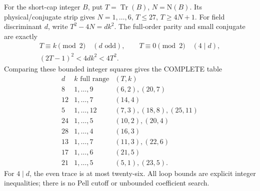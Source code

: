 For the short-cap integer \(B\), put
\(T=\operatorname{Tr}(B)\), \(N=\mathrm N(B)\).
Its physical/conjugate strip gives
\(N=1,\ldots,6\), \(T\le27\), \(T\ge4N+1\).
For field discriminant \(d\), write
\(T^2-4N=dk^2\).
The full-order parity and small conjugate
are exactly
\[
 \begin{gathered}
 T\equiv k\pmod2\quad(d\text{ odd}),\qquad
 T\equiv0\pmod2\quad(4\mid d),\\
                         (2T-1)^2<4dk^2<4T^2 .
 \end{gathered}
\]
Comparing these bounded integer squares
gives the COMPLETE table
\[
\begin{array}{c|c|l}
 d&k\text{ full range}&(T,k)\\ \hline
 8&1,\ldots,9&(6,2),(20,7)\\
 12&1,\ldots,7&(14,4)\\
 5&1,\ldots,12&(7,3),(18,8),(25,11)\\
 24&1,\ldots,5&(10,2),(20,4)\\
 28&1,\ldots,4&(16,3)\\
 13&1,\ldots,7&(11,3),(22,6)\\
 17&1,\ldots,6&(21,5)\\
 21&1,\ldots,5&(5,1),(23,5).
\end{array}
\]
For \(4\mid d\), the even trace is at
most twenty-six.
All loop bounds are explicit integer
inequalities; there is no Pell cutoff
or unbounded coefficient search.

